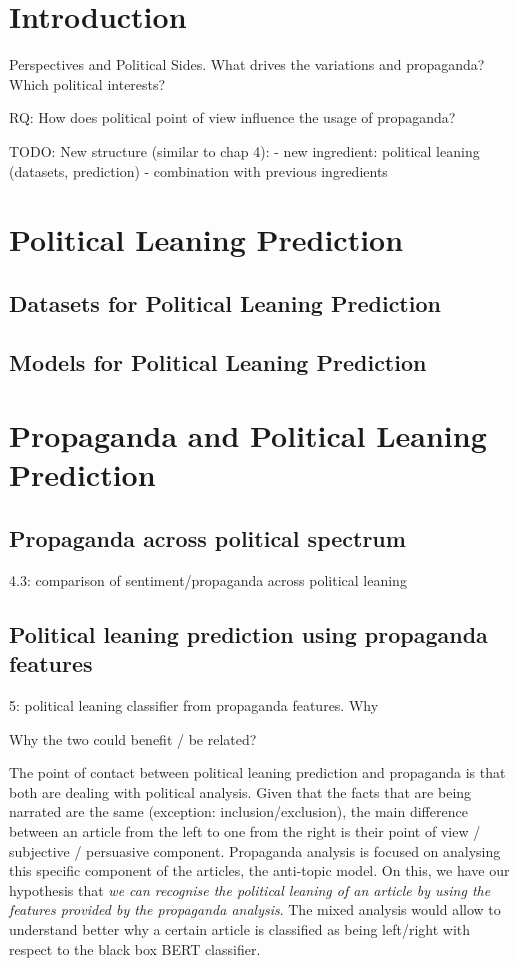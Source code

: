 \label{chap:political_sides}

\section{Introduction}
Perspectives and Political Sides. What drives  the variations and propaganda? Which political interests? 

RQ:
How does political point of view influence the usage of propaganda?


TODO: New structure (similar to chap 4):
- new ingredient: political leaning (datasets, prediction)
- combination with previous ingredients


\section{Political Leaning Prediction}

\subsection{Datasets for Political Leaning Prediction}

\subsection{Models for Political Leaning Prediction}

\section{Propaganda and Political Leaning Prediction}

\subsection{Propaganda across political spectrum}
4.3: comparison of sentiment/propaganda across political leaning

\subsection{Political leaning prediction using propaganda features}
5: political leaning classifier from propaganda features. Why


Why the two could benefit / be related?

The point of contact between political leaning prediction and propaganda is that both are dealing with political analysis.
Given that the facts that are being narrated are the same (exception: inclusion/exclusion), the main difference between an article from the left to one from the right is their point of view / subjective / persuasive component. Propaganda analysis is focused on analysing this specific component of the articles, the anti-topic model.
On this, we have our hypothesis that \emph{we can recognise the political leaning of an article by using the features provided by the propaganda analysis}.
The mixed analysis would allow to understand better why a certain article is classified as being left/right with respect to the black box BERT classifier.

